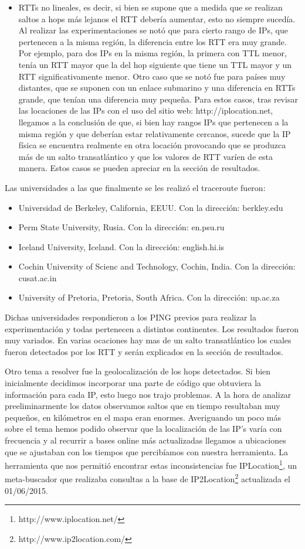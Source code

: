 \begin{itemize}
    \item RTTs no lineales, es decir, si bien se supone que a medida que se realizan saltos a hops más lejanos el RTT debería aumentar, esto no siempre sucedía. Al realizar las experimentaciones se notó que para cierto rango de IPs, que pertenecen a la misma región, la diferencia entre los RTT era muy grande. Por ejemplo, para dos IPs en la misma región, la primera con TTL menor, tenía un RTT mayor que la del hop siguiente que tiene un TTL mayor y un RTT significativamente menor. Otro caso que se notó fue para países muy distantes, que se suponen con un enlace submarino y una diferencia en RTTs grande, que tenían una diferencia muy pequeña. Para estos casos, tras revisar las locaciones de las IPs con el uso del sitio web: http://iplocation.net, llegamos a la conclusión de que, si bien hay rangos IPs que pertenecen a la misma región y que deberían estar relativamente cercanos, sucede que la IP física se encuentra realmente en otra locación provocando que se produzca más de un salto transatlántico y que los valores de RTT varíen de esta manera. Estos casos se pueden apreciar en la sección de resultados.
\end{itemize}

Las universidades a las que finalmente se les realizó el traceroute fueron:

\begin{itemize}
	\item Universidad de Berkeley, California, EEUU. Con la dirección: berkley.edu
	\item Perm State University, Rusia. Con la dirección: en.psu.ru
	\item Iceland University, Iceland. Con la dirección: english.hi.is
	\item Cochin University of Scienc and Technology, Cochin, India. Con la dirección: cusat.ac.in
	\item University of Pretoria, Pretoria, South Africa. Con la dirección: up.ac.za
\end{itemize}

Dichas universidades respondieron a los PING previos para realizar la experimentación y todas pertenecen a distintos continentes. Los resultados fueron muy variados. En varias ocaciones hay mas de un salto transatlántico los cuales fueron detectados por los RTT y serán explicados en la sección de resultados.

Otro tema a resolver fue la geolocalización de los hops detectados. Si bien inicialmente decidimos incorporar una parte de código que obtuviera la información para cada IP, esto luego nos trajo problemas.
A la hora de analizar preeliminarmente los datos observamos saltos que en tiempo resultaban muy pequeños, en kilómetros en el mapa eran enormes.
Averiguando un poco más sobre el tema hemos podido observar que la localización de las IP's varía con frecuencia y al recurrir a bases online más actualizadas llegamos a ubicaciones que se ajustaban con los tiempos que percibíamos con nuestra herramienta.
La herramienta que nos permitió encontrar estas inconsistencias fue IPLocation\footnote{http://www.iplocation.net/}, un meta-buscador que realizaba consultas a la base de IP2Location\footnote{http://www.ip2location.com/} actualizada el 01/06/2015.
